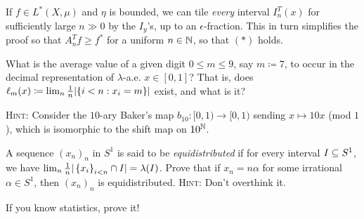 \documentclass[reqno, twoside]{article}
\begin{document}
    \begin{remark}
        If $f\in L^\ast(X,\mu)$ and $\eta$ is bounded, we can tile \textit{every} interval $I_n^T(x)$ for sufficiently large $n\gg0$ by the $I_y$'s, up to an $\epsilon$-fraction. This in turn simplifies the proof so that $A_n^Tf\geq f^\ast$ for a uniform $n\in\mathbb{N}$, so that $(\ast)$ holds.
    \end{remark}

    \begin{exercise}
        What is the average value of a given digit $0\leq m\leq9$, say $m\coloneqq7$, to occur in the decimal representation of $\lambda$-a.e. $x\in[0,1]$? That is, does $\ell_m(x)\coloneqq\lim_n\frac{1}{n}|\{i<n: x_i=m\}|$ exist, and what is it?

        \textsc{Hint:} Consider the $10$-ary Baker's map $b_{10}:[0,1)\to[0,1)$  sending $x\mapsto 10x$ (mod $1$), which is isomorphic to the shift map on $10^{\mathbb{N}}$.
    \end{exercise}

    \begin{exercise}
        A sequence $(x_n)_n$ in $S^1$ is said to be \textit{equidistributed} if for every interval $I\subseteq S^1$, we have $\lim_n\frac{1}{n}|\left\{x_i\right\}_{i<n}\cap I|=\lambda(I)$. Prove that if $x_n=n\alpha$ for some irrational $\alpha\in S^1$, then $(x_n)_n$ is equidistributed. \textsc{Hint:} Don't overthink it.
    \end{exercise}

    \begin{exercise}
        If you know statistics, prove it!
    \end{exercise}
\end{document}
